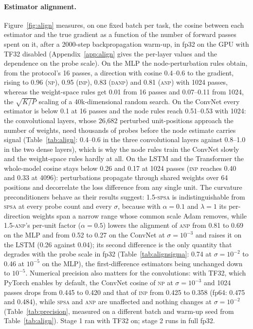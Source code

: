\documentclass{article}
\newcommand{\method}[1]{\textsc{#1}}
\newcommand{\SPSA}{\method{spsa}}
\newcommand{\SPSAb}{\method{1.5-spsa}}
\newcommand{\NP}{\method{np}}
\newcommand{\ANP}{\method{anp}}
\newcommand{\ANPb}{\method{1.5-anp}}
\newcommand{\INP}{\method{inp}}
\newcommand{\DANP}{\method{danp}}
\begin{document}
\paragraph{Estimator alignment.}
Figure~\ref{fig:align} measures, on one fixed batch per task, the cosine between each
estimator and the true gradient as a function of the number of forward passes spent on
it, after a 2000-step backpropagation warm-up, in fp32 on the GPU with TF32 disabled
(Appendix~\ref{app:align} gives the per-layer values and the dependence on the probe
scale). On the MLP the node-perturbation rules obtain, from the protocol's 16 passes,
a direction with cosine 0.4--0.6 to the gradient, rising to 0.96 (\NP{}), 0.95
(\INP{}), 0.83 (\DANP{}) and 0.81 (\ANP{}) with 1024 passes, whereas the weight-space
rules get 0.01 from 16 passes and 0.07--0.11 from 1024, the $\sqrt{K/P}$ scaling of
a 40k-dimensional random search. On the ConvNet every estimator is below 0.1 at 16
passes and the node rules reach 0.51--0.53 with 1024: the convolutional layers, whose
26,682 perturbed unit-positions approach the number of weights, need thousands of
probes before the node estimate carries signal (Table~\ref{tab:align}: 0.4--0.6 in
the three convolutional layers against 0.8--1.0 in the two dense layers), which is why
the node rules train the ConvNet slowly and the weight-space rules hardly at all. On
the LSTM and the Transformer the whole-model cosine stays below 0.26 and 0.17 at 1024
passes (\INP{} reaches 0.40 and 0.33 at 4096): perturbations propagate through shared
weights over 64 positions and decorrelate the loss difference from any single unit. The
curvature preconditioners behave as their results suggest: \SPSAb{} is
indistinguishable from \SPSA{} at every probe count and every $\sigma$, because with
$\alpha=0.1$ and $\lambda=1$ its per-direction weights span a narrow range whose
common scale Adam removes, while \ANPb{}'s per-unit factor ($\alpha=0.5$) lowers the
alignment of \ANP{} from 0.81 to 0.69 on the MLP and from 0.52 to 0.27 on the ConvNet
at $\sigma=10^{-3}$ and raises it on the LSTM (0.26 against 0.04); its second
difference is the only quantity that degrades with the probe scale in fp32
(Table~\ref{tab:alignsigma}: 0.74 at $\sigma=10^{-2}$ to 0.46 at $10^{-5}$ on the
MLP), the first-difference estimators being unchanged down to $10^{-5}$.
Numerical precision also matters for the convolutions: with TF32, which PyTorch
enables by default, the ConvNet cosine of \NP{} at $\sigma=10^{-3}$ and 1024 passes
drops from 0.445 to 0.420 and that of \INP{} from 0.425 to 0.358 (fp64: 0.475 and
0.484), while \SPSA{} and \ANP{} are unaffected and nothing changes at
$\sigma=10^{-2}$ (Table~\ref{tab:precision}, measured on a different batch and
warm-up seed from Table~\ref{tab:align}). Stage 1 ran with TF32 on; stage 2 runs in
full fp32.
\end{document}
